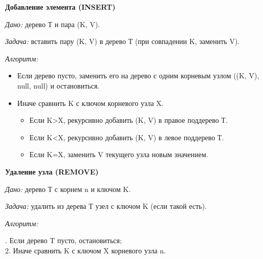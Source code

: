{ \bf Добавление элемента (INSERT)}

\textit{Дано:} дерево Т и пара (K, V).

\textit{Задача:} вставить пару (K, V) в дерево Т (при совпадении K, заменить V).

\textit{Алгоритм:}

\begin{itemize}
\item Если дерево пусто, заменить его на дерево с одним корневым узлом ((K, V), null, null) и остановиться.
\item Иначе сравнить K с ключом корневого узла X.
\begin{itemize}
\item[\labelitemi] Если K>X, рекурсивно добавить (K, V) в правое поддерево Т.
\item[\labelitemi] Если K<X, рекурсивно добавить (K, V) в левое поддерево Т.
\item[\labelitemi] Если K=X, заменить V текущего узла новым значением.

\end{itemize}
\end{itemize}


{ \bf Удаление узла (REMOVE)}


\textit{Дано:} дерево Т с корнем n и ключом K.

\textit{Задача:} удалить из дерева Т узел с ключом K (если такой есть).

\textit{Алгоритм:}


 . Если дерево T пусто, остановиться;\\
2. Иначе сравнить K с ключом X корневого узла n.

